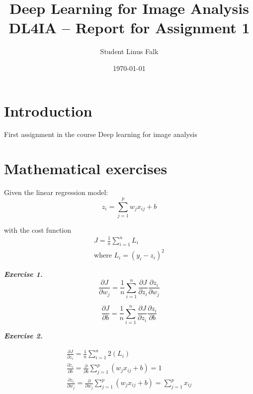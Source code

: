 \documentclass[a4paper,10pt]{article}
\title{\textbf{Deep Learning for Image Analysis} 
\\ DL4IA -- Report for Assignment 1}
\author{Student Linus Falk}
\date{\today}
\begin{document}
\maketitle

\section{Introduction}
First assignment in the course Deep learning for image analysis

\section{Mathematical exercises}

Given the linear regression model:
\begin{equation}
    z_i = \sum_{j=1}^p w_jx_{ij} + b 
\end{equation}

with the cost function 
\begin{equation}
\label{eq:cost}
\begin{split}
    J = \frac{1}{n}\sum_{i=1}^nL_i \\
    \text{where } L_i = (y_i-z_i)^2    
\end{split}
\end{equation}






\textit{\textbf{Exercise 1.}}
\begin{equation*}
    \frac{\partial J} {\partial w_j} = \frac{1} {n} \sum_{i=1}^{n} \frac{\partial J} {\partial z_i}  \frac{\partial z_i} {\partial w_j} 
\end{equation*}

\begin{equation*}
   \frac{\partial J} {\partial b}  = \frac{1} {n} \sum_{i=1}^{n} \frac{\partial J} {\partial z_i}  \frac{\partial z_i} {\partial b} 
\end{equation*}


\textit{\textbf{Exercise 2.}}

\begin{equation*}
\begin{split}
    \frac{\partial J}{\partial z_i} = \frac{1} {n} \sum_{i=1}^{n}  2(L_i) \\
    \frac{\partial z_i} {\partial b} = \frac{\partial} {\partial b}  \sum_{j=1}^p (w_jx_{ij}+b) = 1 \\
    \frac{\partial z_i} {\partial w_j} = \frac{\partial} {\partial w_j} \sum_{j=1}^p (w_jx_{ij}+b) = \sum_{j=1}^p x_{ij}
\end{split}
\end{equation*}
\end{document}
